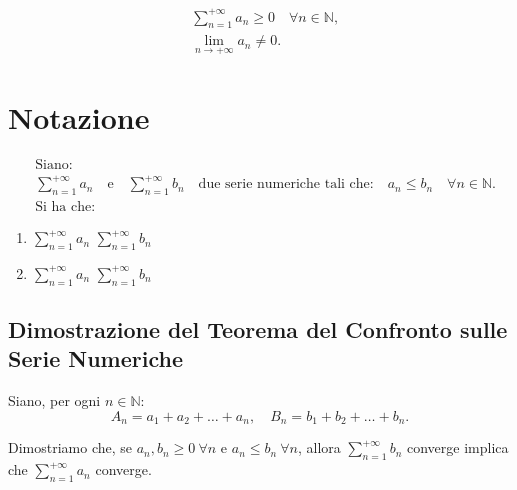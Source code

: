 \documentclass{article}
\begin{document}
\begin{align*}
    &\sum_{n=1}^{+\infty} a_n \geq 0 \quad \forall n \in \mathbb{N}, \\
    &\lim_{n \to +\infty} a_n \neq 0.
\end{align*}

\section*{Notazione}
\begin{align*}
    &\text{Siano:} \\
    &\sum_{n=1}^{+\infty} a_n \quad \text{e} \quad \sum_{n=1}^{+\infty} b_n \quad \text{due serie numeriche tali che:} \quad a_n \leq b_n \quad \forall n \in \mathbb{N}. \\
    &\text{Si ha che:}
\end{align*}

\begin{enumerate}
    \item $\sum_{n=1}^{+\infty} a_n$  $\sum_{n=1}^{+\infty} b_n$
    \item $\sum_{n=1}^{+\infty} a_n$  $\sum_{n=1}^{+\infty} b_n$
\end{enumerate}


\subsection*{Dimostrazione del Teorema del Confronto sulle Serie Numeriche}
Siano, per ogni \( n \in \mathbb{N} \):
\[
A_n = a_1 + a_2 + \dots + a_n, \quad B_n = b_1 + b_2 + \dots + b_n.
\]

\noindent
Dimostriamo che, se \( a_n, b_n \geq 0 \ \forall n \) e \( a_n \leq b_n \ \forall n \), allora \( \sum_{n=1}^{+\infty} b_n \) converge implica che \( \sum_{n=1}^{+\infty} a_n \) converge.
\end{document}
